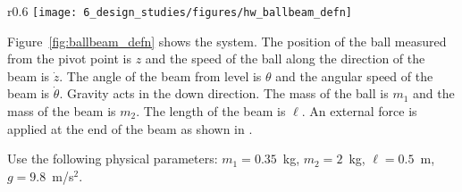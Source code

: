 \begin{wrapfigure}{r}{0.6\textwidth}
  \centering
  \texttt{[image: 6\_design\_studies/figures/hw\_ballbeam\_defn]}\\
  \caption{Ball on Beam Problem}
  \label{fig:ballbeam_defn}
\end{wrapfigure}


Figure~\ref{fig:ballbeam_defn} shows the  system.  The position of the ball measured from the pivot point is $z$ and the speed of the ball along the direction of the beam is $\dot{z}$.  The angle of the beam from level is $\theta$ and the angular speed of the beam is $\dot{\theta}$.  Gravity acts in the down direction.  The mass of the ball is $m_1$ and the mass of the beam is $m_2$.  The length of the beam is $\ell$.  An external force is applied at the end of the beam as shown in .  

Use the following physical parameters: $m_1=0.35$~kg, $m_2=2$~kg, $\ell=0.5$~m, $g=9.8$~m/s$^2$.

